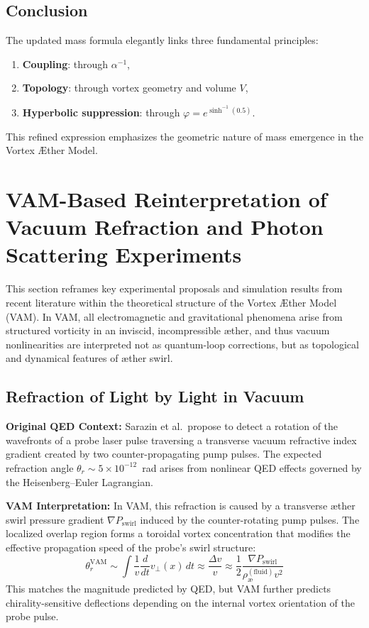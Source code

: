 \documentclass[12pt]{article}
\begin{document}
\subsection*{Conclusion}

The updated mass formula elegantly links three fundamental principles:
\begin{enumerate}
\item \textbf{Coupling}: through $\alpha^{-1}$,
\item \textbf{Topology}: through vortex geometry and volume $V$,
\item \textbf{Hyperbolic suppression}: through $\varphi = e^{\sinh^{-1}(0.5)}$.
\end{enumerate}
This refined expression emphasizes the geometric nature of mass emergence in the Vortex \AE{}ther Model.
\section{VAM-Based Reinterpretation of Vacuum Refraction and Photon Scattering Experiments}

This section reframes key experimental proposals and simulation results from recent literature within the theoretical structure of the Vortex \AE{}ther Model (VAM). In VAM, all electromagnetic and gravitational phenomena arise from structured vorticity in an inviscid, incompressible \ae{}ther, and thus vacuum nonlinearities are interpreted not as quantum-loop corrections, but as topological and dynamical features of \ae{}ther swirl.

\subsection{Refraction of Light by Light in Vacuum~\cite{sarazin2016refraction}}

\textbf{Original QED Context:} Sarazin et al.\ propose to detect a rotation of the wavefronts of a probe laser pulse traversing a transverse vacuum refractive index gradient created by two counter-propagating pump pulses. The expected refraction angle $\theta_r \sim 5 \times 10^{-12}$~rad arises from nonlinear QED effects governed by the Heisenberg--Euler Lagrangian.

\textbf{VAM Interpretation:} In VAM, this refraction is caused by a transverse \ae{}ther swirl pressure gradient $\nabla P_\text{swirl}$ induced by the counter-rotating pump pulses. The localized overlap region forms a toroidal vortex concentration that modifies the effective propagation speed of the probe's swirl structure:
\begin{equation}
\theta_r^\text{VAM} \sim \int \frac{1}{v} \frac{d}{dt} v_\perp(x) \, dt \approx \frac{\Delta v}{v} \approx \frac{1}{2} \frac{\nabla P_\text{swirl}}{\rho_\text{\ae}^{(\text{fluid})} v^2}
\end{equation}
This matches the magnitude predicted by QED, but VAM further predicts chirality-sensitive deflections depending on the internal vortex orientation of the probe pulse.
\end{document}
